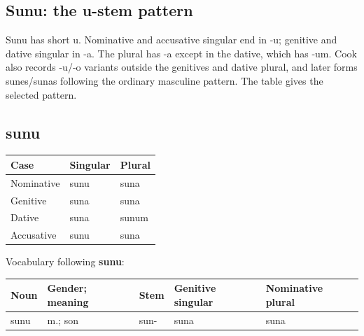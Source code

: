\subsection*{Sunu: the u-stem pattern}

Sunu has short u. Nominative and accusative singular end in -u; genitive and dative singular in -a. The plural has -a except in the dative, which has -um. Cook also records -u/\allowbreak{}-o variants outside the genitives and dative plural, and later forms sunes/\allowbreak{}sunas following the ordinary masculine pattern. The table gives the selected pattern.

\subsection*{sunu}

\par\begingroup
\fontsize{10.5}{13.2}\selectfont
\setlength{\LTleft}{0pt}\setlength{\LTright}{\fill}
\noindent
\begin{tabular}{@{}>{\raggedright\arraybackslash}p{39.46mm}>{\raggedright\arraybackslash}p{39.46mm}>{\raggedright\arraybackslash}p{39.46mm}@{}}
\toprule
\textbf{Case} & \textbf{Singular} & \textbf{Plural} \\
\midrule
Nominative & sunu & suna \\
Genitive & suna & suna \\
Dative & suna & sunum \\
Accusative & sunu & suna \\
\bottomrule
\end{tabular}
\par\endgroup

Vocabulary following \textbf{sunu}:

\par\begingroup
\fontsize{10.5}{13.2}\selectfont
\setlength{\LTleft}{0pt}\setlength{\LTright}{\fill}
\noindent
\begin{tabular}{@{}>{\raggedright\arraybackslash}p{20.21mm}>{\raggedright\arraybackslash}p{21.42mm}>{\raggedright\arraybackslash}p{20.21mm}>{\raggedright\arraybackslash}p{24.35mm}>{\raggedright\arraybackslash}p{26.57mm}@{}}
\toprule
\textbf{Noun} & \textbf{Gender; meaning} & \textbf{Stem} & \textbf{Genitive singular} & \textbf{Nominative plural} \\
\midrule
sunu & m.; son & sun- & suna & suna \\
\bottomrule
\end{tabular}
\par\endgroup

